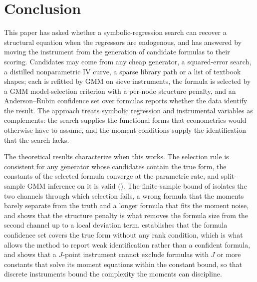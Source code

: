 \section{Conclusion}
\label{sec:limits}

This paper has asked whether a symbolic-regression search can recover a structural equation when the regressors are endogenous, and has answered by moving the instrument from the generation of candidate formulas to their scoring. Candidates may come from any cheap generator, a squared-error search, a distilled nonparametric IV curve, a sparse library path or a list of textbook shapes; each is refitted by GMM on sieve instruments, the formula is selected by a GMM model-selection criterion with a per-node structure penalty, and an Anderson--Rubin confidence set over formulas reports whether the data identify the result. The approach treats symbolic regression and instrumental variables as complements: the search supplies the functional forms that econometrics would otherwise have to assume, and the moment conditions supply the identification that the search lacks.

The theoretical results characterize when this works. The selection rule is consistent for any generator whose candidates contain the true form, the constants of the selected formula converge at the parametric rate, and split-sample GMM inference on it is valid (). The finite-sample bound of  isolates the two channels through which selection fails, a wrong formula that the moments barely separate from the truth and a longer formula that fits the moment noise, and shows that the structure penalty is what removes the formula size from the second channel up to a local deviation term.  establishes that the formula confidence set covers the true form without any rank condition, which is what allows the method to report weak identification rather than a confident formula, and  shows that a $J$-point instrument cannot exclude formulas with $J$ or more constants that solve its moment equations within the constant bound, so that discrete instruments bound the complexity the moments can discipline.

